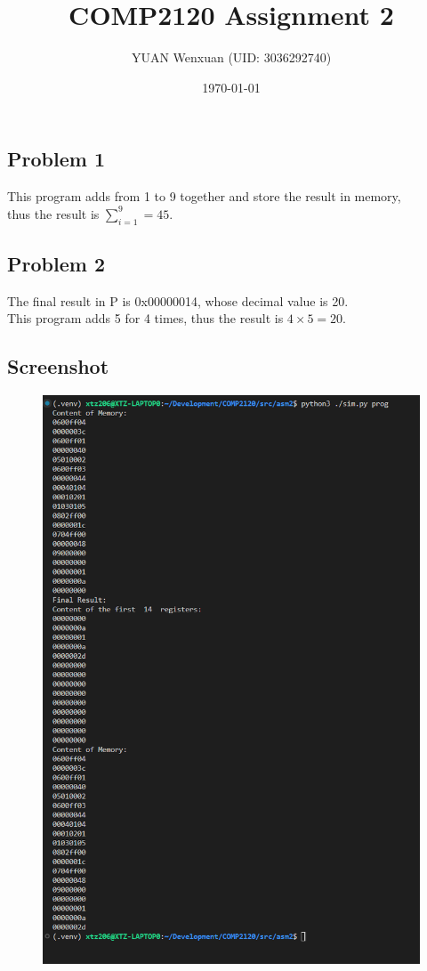 \documentclass{article}
\title{COMP2120 Assignment 2}
\author{YUAN Wenxuan (UID: 3036292740)}
\date{\today}
\begin{document}
\maketitle

\subsection*{Problem 1}

This program adds from 1 to 9 together and store the result in memory, \\
thus the result is $\sum_{i=1}^{9} = 45$.

\subsection*{Problem 2}

The final result in P is 0x00000014, whose decimal value is 20. \\
This program adds 5 for 4 times, thus the result is $4 \times 5 = 20$.

\subsection*{Screenshot}
\begin{figure}[htbp]
    \centering
    \includegraphics[height=0.7\textwidth]{../../media/asm2/asm2.png}
\end{figure}
\end{document}

